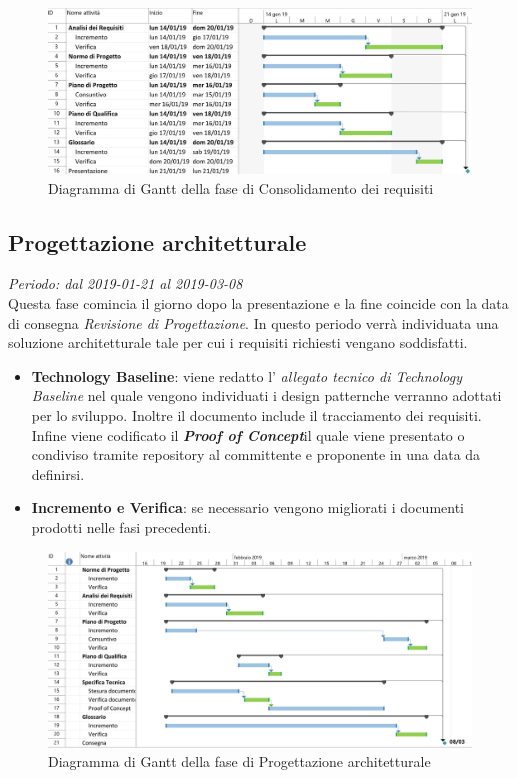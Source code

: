 \begin{figure}[H]
	\includegraphics[width=0.99\linewidth]{res/images/gantt_cons.jpg}
	\caption{Diagramma di Gantt della fase di Consolidamento dei requisiti}
	\label{fig:gantt_con}
\end{figure}

\subsection{Progettazione architetturale}
\textit{Periodo: dal 2019-01-21 al 2019-03-08} \\
Questa fase comincia il giorno dopo la presentazione e la fine coincide con la data di consegna \textit{Revisione di 
Progettazione}. In questo periodo verrà individuata una soluzione architetturale 
tale per cui i requisiti richiesti vengano soddisfatti.
\begin{itemize}
	\item \textbf{Technology Baseline}: viene redatto l'
	\textit{allegato tecnico di Technology Baseline} nel quale vengono 
	individuati i design 
	pattern\glosp che verranno adottati per lo sviluppo. Inoltre il documento 
	include il tracciamento dei requisiti.\\
	Infine viene codificato il \textbf{\textit{Proof of Concept}}\glosp il 
	quale viene presentato o condiviso tramite repository al committente e 
	proponente in una data da definirsi.
	\item \textbf{Incremento e Verifica}: se necessario vengono migliorati i 
	documenti prodotti nelle fasi precedenti.
\end{itemize}

\begin{figure}[H]
	\includegraphics[width=0.99\linewidth]{res/images/gantt_pa.jpg}
	\caption{Diagramma di Gantt della fase di Progettazione architetturale}
\end{figure}


